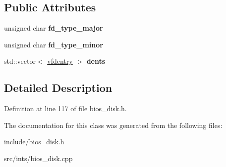 \subsection*{Public Attributes}
\begin{DoxyCompactItemize}
\item 
\hypertarget{classimageDiskD88_ac78893683ee0ae39a20c484f66f4b93c}{unsigned char {\bfseries fd\-\_\-type\-\_\-major}}\label{classimageDiskD88_ac78893683ee0ae39a20c484f66f4b93c}

\item 
\hypertarget{classimageDiskD88_adee44970e1d1ef3ddb7c59074121afb6}{unsigned char {\bfseries fd\-\_\-type\-\_\-minor}}\label{classimageDiskD88_adee44970e1d1ef3ddb7c59074121afb6}

\item 
\hypertarget{classimageDiskD88_a9bff60346c5b14b0728d958cdcd4053a}{std\-::vector$<$ \hyperlink{structimageDiskD88_1_1vfdentry}{vfdentry} $>$ {\bfseries dents}}\label{classimageDiskD88_a9bff60346c5b14b0728d958cdcd4053a}

\end{DoxyCompactItemize}


\subsection{Detailed Description}


Definition at line 117 of file bios\-\_\-disk.\-h.



The documentation for this class was generated from the following files\-:\begin{DoxyCompactItemize}
\item 
include/bios\-\_\-disk.\-h\item 
src/ints/bios\-\_\-disk.\-cpp\end{DoxyCompactItemize}
